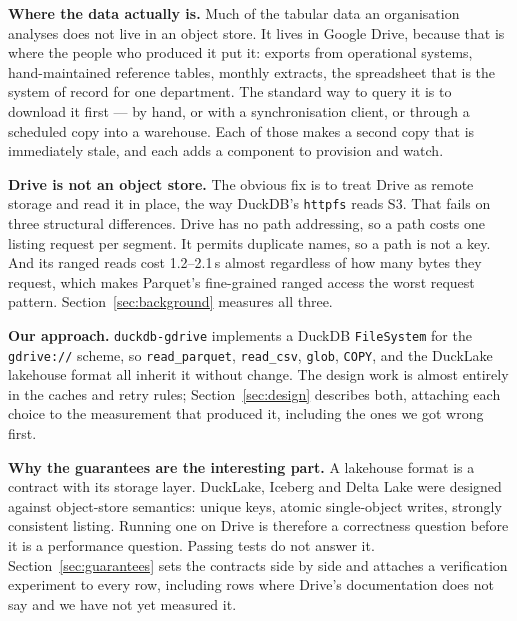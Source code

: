 \documentclass[sigconf, nonacm]{acmart}
\begin{document}
\textbf{Where the data actually is.}
Much of the tabular data an organisation analyses does not live in an
object store. It lives in Google Drive, because that is where the people who
produced it put it: exports from operational systems, hand-maintained
reference tables, monthly extracts, the spreadsheet that is the system of
record for one department. The standard way to query it is to download it
first --- by hand, or with a synchronisation client, or through a scheduled
copy into a warehouse. Each of those makes a second copy that is immediately
stale, and each adds a component to provision and watch.

\textbf{Drive is not an object store.}
The obvious fix is to treat Drive as remote storage and read it in place, the
way DuckDB's \texttt{httpfs} reads S3. That fails on three structural
differences. Drive has no path addressing, so a path costs one listing request
per segment. It permits duplicate names, so a path is not a key. And its
ranged reads cost 1.2--2.1\,s almost regardless of how many bytes they request,
which makes Parquet's fine-grained ranged access the worst request pattern.
Section~\ref{sec:background} measures all three.

\textbf{Our approach.}
\texttt{duckdb-gdrive} implements a DuckDB \texttt{FileSystem} for the
\texttt{gdrive://} scheme, so \texttt{read\_parquet}, \texttt{read\_csv},
\texttt{glob}, \texttt{COPY}, and the DuckLake lakehouse format all inherit it
without change. The design work is almost entirely in the caches and retry
rules; Section~\ref{sec:design} describes both, attaching each choice to the
measurement that produced it, including the ones we got wrong first.

\textbf{Why the guarantees are the interesting part.}
A lakehouse format is a contract with its storage layer. DuckLake, Iceberg and
Delta Lake were designed against object-store semantics: unique keys, atomic
single-object writes, strongly consistent listing. Running one on Drive is
therefore a correctness question before it is a performance question. Passing
tests do not answer it. Section~\ref{sec:guarantees} sets the contracts side
by side and attaches a verification experiment to every row, including rows
where Drive's documentation does not say and we have not yet measured it.
\end{document}
